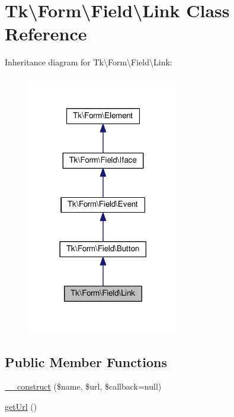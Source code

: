 \hypertarget{classTk_1_1Form_1_1Field_1_1Link}{\section{Tk\textbackslash{}Form\textbackslash{}Field\textbackslash{}Link Class Reference}
\label{classTk_1_1Form_1_1Field_1_1Link}
}


Inheritance diagram for Tk\textbackslash{}Form\textbackslash{}Field\textbackslash{}Link\+:\nopagebreak
\begin{figure}[H]
\begin{center}
\leavevmode
\includegraphics[width=189pt]{classTk_1_1Form_1_1Field_1_1Link__inherit__graph}
\end{center}
\end{figure}
\subsection*{Public Member Functions}
\begin{DoxyCompactItemize}
\item 
\hyperlink{classTk_1_1Form_1_1Field_1_1Link_ab75ca5262d7ee236847eb2888e23d62e}{\+\_\+\+\_\+construct} (\$name, \$url, \$callback=null)
\item 
\hyperlink{classTk_1_1Form_1_1Field_1_1Link_a0fb61411b843f99dfc61263b6bd7b197}{get\+Url} ()
\end{DoxyCompactItemize}
